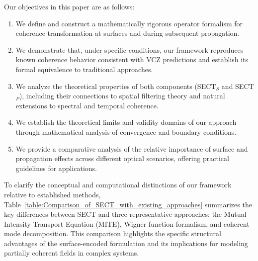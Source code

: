 \documentclass[a4paper,12pt]{article}
\begin{document}
Our objectives in this paper are as follows:
\begin{enumerate}
    \item We define and construct a mathematically rigorous operator formalism for coherence transformation at surfaces and during subsequent propagation.
    \item We demonstrate that, under specific conditions, our framework reproduces known coherence behavior consistent with VCZ predictions and establish its formal equivalence to traditional approaches.
    \item We analyze the theoretical properties of both components (SECT$_S$ and SECT$_P$), including their connections to spatial filtering theory and natural extensions to spectral and temporal coherence.
    \item We establish the theoretical limits and validity domains of our approach through mathematical analysis of convergence and boundary conditions.
    \item We provide a comparative analysis of the relative importance of surface and propagation effects across different optical scenarios, offering practical guidelines for applications.
\end{enumerate}

To clarify the conceptual and computational distinctions of our framework relative to established methods, 
Table~\ref{table:Comparison_of_SECT_with_existing_approaches} 
summarizes the key differences between SECT and three representative approaches: the Mutual Intensity Transport 
Equation (MITE), Wigner function formalism, and coherent mode decomposition. This comparison highlights the specific 
structural advantages of the surface-encoded formulation and its implications for modeling partially coherent fields in 
complex systems.
\end{document}
